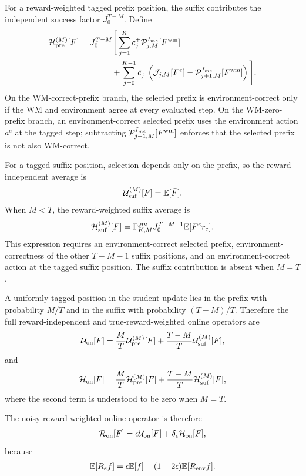 \documentclass{article}
\begin{document}
For a reward-weighted tagged prefix position, the suffix contributes the independent success factor $J_0^{T-M}$. Define
\begin{align}
\mathcal H_{\rm pre}^{(M)}[F] &= J_0^{T-M} \Bigg[ \sum_{j=1}^K c_j^+\mathcal P_{j,M}^{I_{me}}[F^{\rm wm}] \\
&\qquad\qquad+ \sum_{j=0}^{K-1}\bar c_j^- \left(\mathcal J_{j,M}[F^e]-\mathcal P_{j+1,M}^{I_{me}}[F^{\rm wm}]\right) \Bigg].
\end{align}
On the WM-correct-prefix branch, the selected prefix is environment-correct only if the WM and environment agree at every evaluated step. On the WM-zero-prefix branch, an environment-correct selected prefix uses the environment action $a^e$ at the tagged step; subtracting $\mathcal P_{j+1,M}^{I_{me}}[F^{\rm wm}]$ enforces that the selected prefix is not also WM-correct.

For a tagged suffix position, selection depends only on the prefix, so the reward-independent average is
\begin{align}
\mathcal U_{\rm suf}^{(M)}[F]=\mathbb E[\bar F].
\end{align}
When $M<T$, the reward-weighted suffix average is
\begin{align}
\mathcal H_{\rm suf}^{(M)}[F] = \Gamma_{K,M}^{\rm pre} J_0^{T-M-1} \mathbb E[F^e r_e].
\end{align}
This expression requires an environment-correct selected prefix, environment-correctness of the other $T-M-1$ suffix positions, and an environment-correct action at the tagged suffix position. The suffix contribution is absent when $M=T$.

A uniformly tagged position in the student update lies in the prefix with probability $M/T$ and in the suffix with probability $(T-M)/T$. Therefore the full reward-independent and true-reward-weighted online operators are
\begin{align}
\mathcal U_{\rm on}[F] = \frac{M}{T}\mathcal U_{\rm pre}^{(M)}[F] +\frac{T-M}{T}\mathcal U_{\rm suf}^{(M)}[F],
\end{align}
and
\begin{align}
\mathcal H_{\rm on}[F] = \frac{M}{T}\mathcal H_{\rm pre}^{(M)}[F] +\frac{T-M}{T}\mathcal H_{\rm suf}^{(M)}[F],
\end{align}
where the second term is understood to be zero when $M=T$.

The noisy reward-weighted online operator is therefore
\begin{align}
\mathcal R_{\rm on}[F] =\epsilon\mathcal U_{\rm on}[F] +\delta_\epsilon\mathcal H_{\rm on}[F],
\end{align}
because
\begin{align}
\mathbb E[R_e f] =\epsilon\mathbb E[f]+(1-2\epsilon)\mathbb E[R_{\rm env} f].
\end{align}
\end{document}
